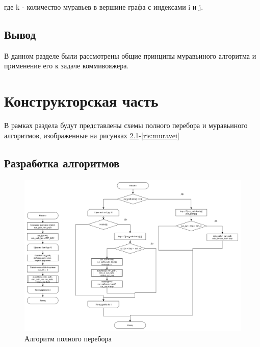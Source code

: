 \documentclass[a4paper,12pt]{report}
\begin{document}
   			где k - количество муравьев в вершине графа с индексами i и j.

	\section{Вывод}

    		В данном разделе были рассмотрены общие принципы муравьиного алгоритма и применение его к задаче коммивояжера. 

    \newpage

    \chapter{Конструкторская часть}
        \label{sec:construct_part}
 
        	В рамках раздела будут представлены схемы полного перебора и муравьиного алгоритмов, изображенные на рисунках \ref{ris:full}-\ref{ris:muravei}

	\section{Разработка алгоритмов}
	
		\begin{figure}[h!]
			\centering
			\includegraphics[width=1.05\linewidth]{full1.png}
			\caption{Алгоритм полного перебора}
			\label{ris:full}
		\end{figure}
		
		\newpage
		
\end{document}

